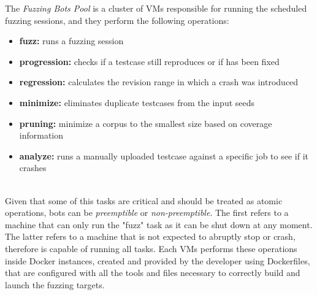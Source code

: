 \documentclass[Lau,oneside]{sapthesis}%
\begin{document}
The \textit{Fuzzing Bots Pool} is a cluster of VMs responsible for running the scheduled fuzzing sessions, and they perform the following operations:
\begin{itemize}
    \item \textbf{fuzz:} runs a fuzzing session
    \item \textbf{progression:} checks if a testcase still reproduces or if has been fixed
    \item \textbf{regression:} calculates the revision range in which a crash was introduced
    \item \textbf{minimize:} eliminates duplicate testcases from the input seeds
    \item \textbf{pruning:} minimize a corpus to the smallest size based on coverage information
    \item \textbf{analyze:} runs a manually uploaded testcase against a specific job to see if it crashes
\end{itemize}
\ \\
Given that some of this tasks are critical and should be treated as atomic operations, bots can be \textit{preemptible} or \textit{non-preemptible}.
\newline
The first refers to a machine that can only run the "fuzz" task as it can be shut down at any moment.
\newline
The latter refers to a machine that is not expected to abruptly stop or crash, therefore is capable of running all tasks.
\newline \newline \newline
Each VMs performs these operations inside Docker instances, created and provided by the developer using Dockerfiles, that are configured with all the tools and files necessary to correctly build and launch the fuzzing targets.





\ \\
\end{document}
